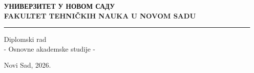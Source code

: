 
\begin{titlepage}
\centering
{\bfseries УНИВЕРЗИТЕТ У НОВОМ САДУ\\FAKULTET TEHNIČKIH NAUKA U NOVOM SADU}\\[2pt]
\rule{\textwidth}{0.8pt}

\vspace{5cm}
\begin{flushleft}
\Autor
\end{flushleft}

\vspace{4.5cm}
{\LARGE\bfseries \Naslov}

\vspace{1cm}
Diplomski rad\\
- Osnovne akademske studije -

\vfill
Novi Sad, 2026.
\end{titlepage}


